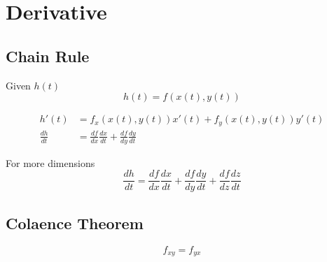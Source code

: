 \section{Derivative}

  \subsection{Chain Rule}

    Given $ h(t) $
    \begin{displaymath}
      h(t) = f(x(t), y(t))
    \end{displaymath}

    \begin{align}
      h'(t)
        &= f_{x}\left( x(t), y(t) \right) x'(t)
        + f_{y} \left(x(t), y(t) \right) y'(t) \\
      \frac{dh}{dt}
        &= \frac{df}{dx} \frac{dx}{dt}
        + \frac{df}{dy} \frac{dy}{dt}
    \end{align}

    For more dimensions
    \begin{equation}
      \frac{dh}{dt}
        = \frac{df}{dx} \frac{dx}{dt}
        + \frac{df}{dy} \frac{dy}{dt}
        + \frac{df}{dz} \frac{dz}{dt}
    \end{equation}

  \subsection{Colaence Theorem}

    \begin{equation}
      f_{xy} = f_{yx}
    \end{equation}
